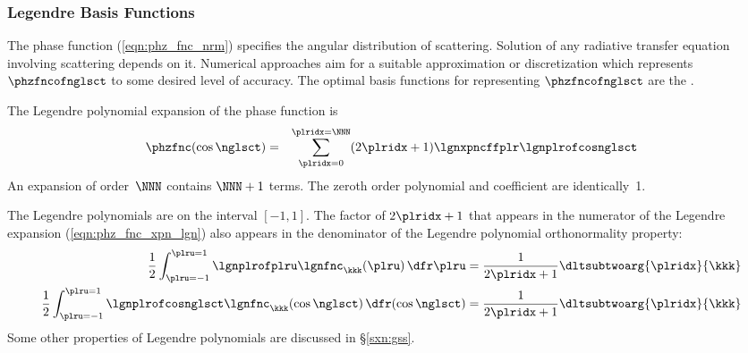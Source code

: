 \documentclass[12pt]{article}
\begin{document}
\subsubsection[Legendre Basis Functions]{Legendre Basis Functions}

The phase function (\ref{eqn:phz_fnc_nrm}) specifies the angular
distribution of scattering.
Solution of any radiative transfer equation involving scattering
depends on it.
Numerical approaches aim for a suitable approximation or
discretization which represents $\phzfncofnglsct$ to some desired
level of accuracy. 
The optimal basis functions for representing $\phzfncofnglsct$
are the .

The Legendre polynomial expansion of the phase function is 
\begin{eqnarray}
\label{eqn:phz_fnc_xpn_lgn}
\phzfnc(\cos\nglsct) & = & \sum_{\plridx=0}^{\plridx=\NNN}
(2\plridx+1) \lgnxpncffplr \lgnplrofcosnglsct 
\end{eqnarray}
An expansion of order~$\NNN$ contains $\NNN+1$ terms. 
The zeroth order polynomial and coefficient are identically~1.

The Legendre polynomials are  on the interval
$[-1,1]$.
The factor of $2\plridx+1$ that appears in the numerator of the
Legendre expansion (\ref{eqn:phz_fnc_xpn_lgn}) also appears
in the denominator of the Legendre polynomial orthonormality
property: 
\begin{subequations}
\label{eqn:lgn_fnc_nrm_plr}
\begin{align}
\frac{1}{2}
\int_{\plru = -1}^{\plru = 1} 
\lgnplrofplru \lgnfnc_{\kkk}(\plru) \,\dfr\plru & =
\frac{1}{2\plridx + 1} \dltsubtwoarg{\plridx}{\kkk} \\
\frac{1}{2}
\int_{\plru = -1}^{\plru = 1} 
\lgnplrofcosnglsct \lgnfnc_{\kkk}(\cos\nglsct) \,\dfr(\cos\nglsct) & =
\frac{1}{2\plridx + 1} \dltsubtwoarg{\plridx}{\kkk}
\end{align}
\end{subequations}
Some other properties of Legendre polynomials are discussed in
\S\ref{sxn:gss}. 
\end{document}
